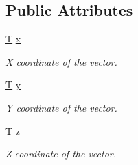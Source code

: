 \subsection*{Public Attributes}
\begin{DoxyCompactItemize}
\item 
\hyperlink{curses_8priv_8h_a5ef253115820acf7d27f3c5c3b02a0f0}{T} \hyperlink{classsf_1_1_vector3_a3cb0c769390bc37c346bb1a69e510d16}{x}
\begin{DoxyCompactList}\small\item\em X coordinate of the vector. \end{DoxyCompactList}\item 
\hyperlink{curses_8priv_8h_a5ef253115820acf7d27f3c5c3b02a0f0}{T} \hyperlink{classsf_1_1_vector3_a6590d50ccb862c5efc5512e974e9b794}{y}
\begin{DoxyCompactList}\small\item\em Y coordinate of the vector. \end{DoxyCompactList}\item 
\hyperlink{curses_8priv_8h_a5ef253115820acf7d27f3c5c3b02a0f0}{T} \hyperlink{classsf_1_1_vector3_a2f36ab4b552c028e3a9734c1ad4df7d1}{z}
\begin{DoxyCompactList}\small\item\em Z coordinate of the vector. \end{DoxyCompactList}\end{DoxyCompactItemize}
